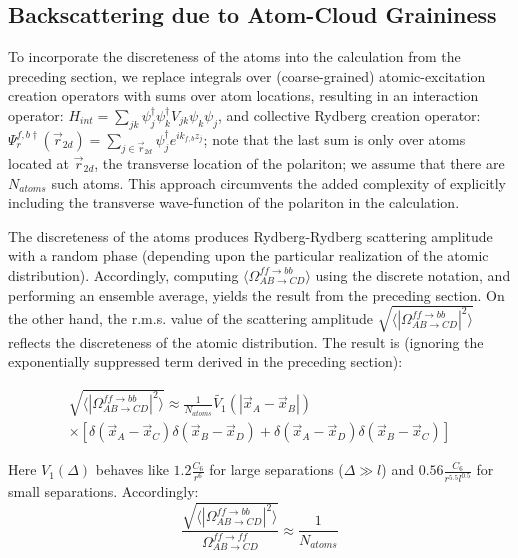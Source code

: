 \documentclass[aps,pra,twocolumn,groupedaddress,10pt,showpacs]{revtex4-1}
\begin{document}
\subsection{Backscattering due to Atom-Cloud Graininess}
To incorporate the discreteness of the atoms into the calculation from the preceding section, we replace integrals over (coarse-grained) atomic-excitation creation operators with sums over atom locations, resulting in an interaction operator: $H_{int}=\sum_{jk}\psi_{j}^\dagger\psi_k^\dagger V_{jk}\psi_k\psi_j$, and collective Rydberg creation operator: $\Psi_r^{{f,b}\dagger}(\vec{r}_{2d})=\sum_{j\in \vec{r}_{2d}} \psi_j^\dagger e^{i k_{f,b}z_j}$; note that the last sum is only over atoms located at $\vec{r}_{2d}$, the transverse location of the polariton; we assume that there are $N_{atoms}$ such atoms. This approach circumvents the added complexity of explicitly including the transverse wave-function of the polariton in the calculation.

The discreteness of the atoms produces Rydberg-Rydberg scattering amplitude with a random phase (depending upon the particular realization of the atomic distribution). Accordingly, computing $\langle\Omega_{AB\rightarrow CD}^{ff\rightarrow bb}\rangle$ using the discrete notation, and performing an ensemble average, yields the result from the preceding section. On the other hand, the r.m.s. value of the scattering amplitude $\sqrt{\langle|\Omega_{AB\rightarrow CD}^{ff\rightarrow bb}|^2\rangle}$ reflects the discreteness of the atomic distribution. The result is (ignoring the exponentially suppressed term derived in the preceding section):

\begin{multline}
\sqrt{\langle|\Omega_{AB\rightarrow CD}^{ff\rightarrow bb}|^2\rangle} \approx \frac{1}{N_{atoms}} \tilde{V_1}(|\vec{x}_A-\vec{x}_B|)
\\ \times \left[\delta(\vec{x}_A-\vec{x}_C)\delta(\vec{x}_B-\vec{x}_D)+\delta(\vec{x}_A-\vec{x}_D)\delta(\vec{x}_B-\vec{x}_C)\right]
\end{multline}

Here $V_1(\Delta)$ behaves like $1.2\frac{C_6}{r^6}$ for large separations ($\Delta \gg l$) and $0.56\frac{C_6}{r^{5.5} l^{0.5}}$ for small separations. Accordingly:
\begin{equation}
\frac{\sqrt{\langle|\Omega_{AB\rightarrow CD}^{ff\rightarrow bb}|^2\rangle}}{\Omega_{AB\rightarrow CD}^{ff\rightarrow ff}}\approx \frac{1}{N_{atoms}}
\end{equation}
\end{document}
